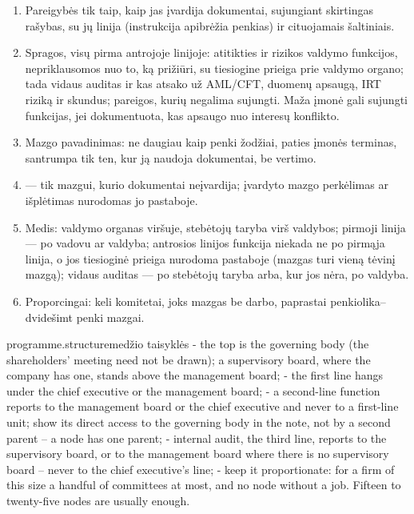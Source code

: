 \begin{enumerate}[itemsep=1pt, topsep=3pt]
  \item Pareigybės tik taip, kaip jas įvardija dokumentai, sujungiant skirtingas rašybas, su jų
    linija (instrukcija apibrėžia penkias) ir cituojamais šaltiniais.
  \item Spragos, visų pirma antrojoje linijoje: atitikties ir rizikos valdymo funkcijos,
    nepriklausomos nuo to, ką prižiūri, su tiesiogine prieiga prie valdymo organo; tada vidaus
    auditas ir kas atsako už AML/CFT, duomenų apsaugą, IRT riziką ir skundus; pareigos, kurių
    negalima sujungti. Maža įmonė gali sujungti funkcijas, jei dokumentuota, kas apsaugo nuo
    interesų konflikto.
  \item Mazgo pavadinimas: ne daugiau kaip penki žodžiai, paties įmonės terminas, santrumpa tik
    ten, kur ją naudoja dokumentai, be vertimo.
  \item {} --- tik mazgui, kurio dokumentai neįvardija; įvardyto mazgo perkėlimas
    ar išplėtimas nurodomas jo pastaboje.
  \item Medis: valdymo organas viršuje, stebėtojų taryba virš valdybos; pirmoji linija --- po
    vadovu ar valdyba; antrosios linijos funkcija niekada ne po pirmąja linija, o jos tiesioginė
    prieiga nurodoma pastaboje (mazgas turi vieną tėvinį mazgą); vidaus auditas --- po
    stebėtojų taryba arba, kur jos nėra, po valdyba.
  \item Proporcingai: keli komitetai, joks mazgas be darbo, paprastai penkiolika--dvidešimt
    penki mazgai.
\end{enumerate}

\par\nopagebreak
\begin{promptexcerpt}{programme.structure}{medžio taisyklės}
   - the top is the governing body (the shareholders' meeting need not be drawn); a supervisory board, where the company has one, stands above the management board;
   - the first line hangs under the chief executive or the management board;
   - a second-line function reports to the management board or the chief executive and never to a first-line unit; show its direct access to the governing body in the note, not by a second parent – a node has one parent;
   - internal audit, the third line, reports to the supervisory board, or to the management board where there is no supervisory board – never to the chief executive's line;
   - keep it proportionate: for a firm of this size a handful of committees at most, and no node without a job. Fifteen to twenty-five nodes are usually enough.
\end{promptexcerpt}

